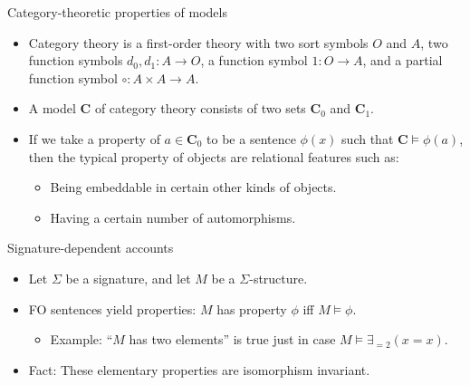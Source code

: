 \documentclass{beamer}
\begin{document}
\begin{frame}{Category-theoretic properties of models}

\begin{itemize}
\item Category theory is a first-order theory with two sort symbols
  $O$ and $A$, two function symbols $d_0,d_1:A\to O$, a function
  symbol $1:O\to A$, and a partial function symbol
  $\circ :A\times A\to A$.
\item A model $\mathbf{C}$ of category theory consists of two sets
  $\mathbf{C}_0$ and $\mathbf{C}_1$.
\item If we take a property of $a\in \mathbf{C}_0$ to be a sentence
  $\phi (x)$ such that $\mathbf{C}\models \phi (a)$, then the typical
  property of objects are relational features such as:

  \begin{itemize}
  \item Being embeddable in certain other kinds of objects.
  \item Having a certain number of automorphisms.
  \end{itemize}
\end{itemize}
\end{frame}

\begin{frame}{Signature-dependent accounts}

  \begin{itemize}
  \item Let $\Sigma$ be a signature, and let $M$ be a
    $\Sigma$-structure.
  \item FO sentences yield properties: $M$ has property $\phi$ iff
    $M\vDash \phi$.
    \begin{itemize}
    \item Example: ``$M$ has two elements'' is true just in case
      $M\vDash \exists _{=2}(x=x)$.
    \end{itemize}
    \item Fact: These elementary properties are isomorphism invariant.
    \end{itemize}
  \end{frame}
\end{document}
